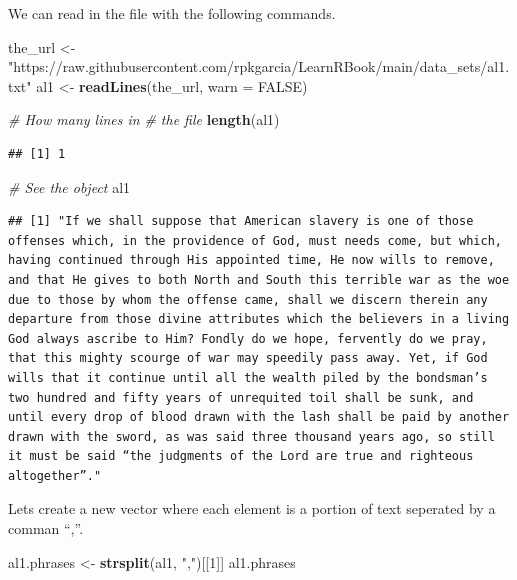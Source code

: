 \documentclass[
]{book}
\newenvironment{Shaded}{\begin{snugshade}}{\end{snugshade}}
\newcommand{\CommentTok}[1]{\textcolor[rgb]{0.56,0.35,0.01}{\textit{#1}}}
\newcommand{\DataTypeTok}[1]{\textcolor[rgb]{0.13,0.29,0.53}{#1}}
\newcommand{\DecValTok}[1]{\textcolor[rgb]{0.00,0.00,0.81}{#1}}
\newcommand{\KeywordTok}[1]{\textcolor[rgb]{0.13,0.29,0.53}{\textbf{#1}}}
\newcommand{\NormalTok}[1]{#1}
\newcommand{\OtherTok}[1]{\textcolor[rgb]{0.56,0.35,0.01}{#1}}
\newcommand{\StringTok}[1]{\textcolor[rgb]{0.31,0.60,0.02}{#1}}
\begin{document}
We can read in the file with the following commands.

\begin{Shaded}
\begin{Highlighting}[]
\NormalTok{the_url <-}\StringTok{ "https://raw.githubusercontent.com/rpkgarcia/LearnRBook/main/data_sets/al1.txt"}
\NormalTok{al1 <-}\StringTok{ }\KeywordTok{readLines}\NormalTok{(the_url,}
    \DataTypeTok{warn =} \OtherTok{FALSE}\NormalTok{)}

\CommentTok{# How many lines in}
\CommentTok{# the file}
\KeywordTok{length}\NormalTok{(al1)}
\end{Highlighting}
\end{Shaded}

\begin{verbatim}
## [1] 1
\end{verbatim}

\begin{Shaded}
\begin{Highlighting}[]
\CommentTok{# See the object}
\NormalTok{al1}
\end{Highlighting}
\end{Shaded}

\begin{verbatim}
## [1] "If we shall suppose that American slavery is one of those offenses which, in the providence of God, must needs come, but which, having continued through His appointed time, He now wills to remove, and that He gives to both North and South this terrible war as the woe due to those by whom the offense came, shall we discern therein any departure from those divine attributes which the believers in a living God always ascribe to Him? Fondly do we hope, fervently do we pray, that this mighty scourge of war may speedily pass away. Yet, if God wills that it continue until all the wealth piled by the bondsman’s two hundred and fifty years of unrequited toil shall be sunk, and until every drop of blood drawn with the lash shall be paid by another drawn with the sword, as was said three thousand years ago, so still it must be said “the judgments of the Lord are true and righteous altogether”."
\end{verbatim}

Lets create a new vector where each element is a portion of text seperated by a comman ``,''.

\begin{Shaded}
\begin{Highlighting}[]
\NormalTok{al1.phrases <-}\StringTok{ }\KeywordTok{strsplit}\NormalTok{(al1,}
    \StringTok{","}\NormalTok{)[[}\DecValTok{1}\NormalTok{]]}
\NormalTok{al1.phrases}
\end{Highlighting}
\end{Shaded}
\end{document}
